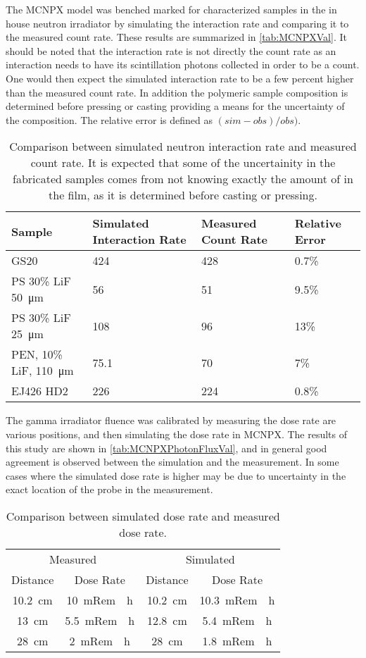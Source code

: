 The MCNPX model was benched marked for characterized samples in the in house  neutron irradiator by simulating the interaction rate and comparing it to the measured count rate.
These results are summarized in \autoref{tab:MCNPXVal}.
It should be noted that the interaction rate is not directly the count rate as an interaction needs to have its scintillation photons collected in order to be a count. 
One would then expect the simulated interaction rate to be a few percent higher than the measured count rate.
In addition the polymeric sample composition is determined before pressing or casting providing a means for the uncertainty of the composition.
The relative error is defined as $(sim-obs)/obs)$.
\begin{table}
	\centering
	\caption[MCNPX Neutron Validation Results]{Comparison between simulated neutron interaction rate and measured count rate. It is expected that some of the uncertainity in the fabricated samples comes from not knowing exactly the amount of  in the film, as it is determined before casting or pressing.}
	\label{tab:MCNPXVal}
	\begin{tabular}{m{4cm} | p{3cm} p{3cm} p{2cm}}
		\toprule
			Sample & Simulated Interaction Rate & Measured Count Rate & Relative Error \\
		\midrule
			GS20 & 424  & 428 & 0.7\%  \\ 
			PS 30\% LiF \SI{50}{\um} &  56 & 51 & 9.5\% \\
			PS 30\% LiF \SI{25}{\um} & 108 & 96 &13\%  \\
			PEN, 10\% LiF, \SI{110}{\um} & 75.1 & 70 & 7\% \\
			EJ426 HD2 & 226 & 224 & 0.8\% \\
		\bottomrule
	\end{tabular}
\end{table}

The gamma irradiator fluence was calibrated by measuring the dose rate are various positions, and then simulating the dose rate in MCNPX.
The results of this study are shown in \autoref{tab:MCNPXPhotonFluxVal}, and in general good agreement is observed between the simulation and the measurement.
In some cases where the simulated dose rate is higher may be due to uncertainty in the exact location of the probe in the measurement.
\begin{table}
	\centering
	\caption[MCNPX Photon Dose Rate Validation Results]{Comparison between simulated dose rate and measured dose rate.}
	\label{tab:MCNPXPhotonFluxVal}
	\begin{tabular}{c  c |c  c}
		\toprule
		\multicolumn{2}{c}{Measured} & \multicolumn{2}{c}{Simulated} \\
		Distance  & Dose Rate & Distance & Dose Rate \\
		\midrule
		\SI{10.2}{\cm} & \SI{10}{mRem \per h} & \SI{10.2}{\cm} & \SI{10.3}{mRem \per h} \\
		\SI{13}{\cm} & \SI{5.5}{mRem \per h} & \SI{12.8}{\cm} & \SI{5.4}{mRem \per h} \\
		\SI{28}{\cm} & \SI{2}{mRem \per h} & \SI{28}{\cm} & \SI{1.8}{mRem \per h} \\
		\bottomrule
	\end{tabular}
\end{table}

